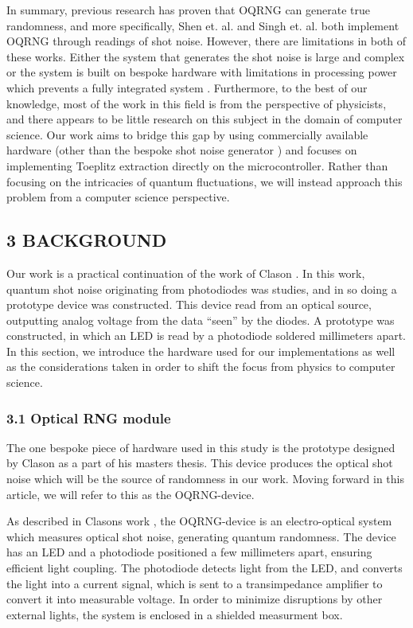\documentclass{sigchi}
\begin{document}
In summary, previous research has proven that OQRNG can generate true randomness, and more specifically, Shen et. al. \cite{contender1} and Singh et. al. \cite{singh} both implement OQRNG through readings of shot noise. However, there are limitations in both of these works. Either the system that generates the shot noise is large and complex \cite{contender1} or the system is built on bespoke hardware with limitations in processing power which prevents a fully integrated system \cite{singh}. Furthermore, to the best of our knowledge, most of the work in this field is from the perspective of physicists, and there appears to be little research on this subject in the domain of computer science. Our work aims to bridge this gap by using commercially available hardware (other than the bespoke shot noise generator \cite{Clason2023}) and focuses on implementing Toeplitz extraction directly on the microcontroller. Rather than focusing on the intricacies of quantum fluctuations, we will instead approach this problem from a computer science perspective.

\subsection{3 BACKGROUND}\label{background}

Our work is a practical continuation of the work of Clason \cite{Clason2023}. In this work, quantum shot noise originating from photodiodes was studies, and in so doing a prototype device was constructed. This device read from an optical source, outputting analog voltage from the data ``seen'' by the diodes. A prototype was constructed, in which an LED is read by a photodiode soldered millimeters apart. In this section, we introduce the hardware used for our implementations as well as the considerations taken in order to shift the focus from physics to computer science.

\subsubsection{3.1 Optical RNG module}\label{optical-rng-module}

The one bespoke piece of hardware used in this study is the prototype designed by Clason \cite{Clason2023} as a part of his masters thesis. This device produces the optical shot noise which will be the source of randomness in our work. Moving forward in this article, we will refer to this as the OQRNG-device.

As described in Clasons work \cite{Clason2023}, the OQRNG-device is an electro-optical system which measures optical shot noise, generating quantum randomness. The device has an LED and a photodiode positioned a few millimeters apart, ensuring efficient light coupling. The photodiode detects light from the LED, and converts the light into a current signal, which is sent to a transimpedance amplifier to convert it into measurable voltage. In order to minimize disruptions by other external lights, the system is enclosed in a shielded measurment box.
\end{document}
